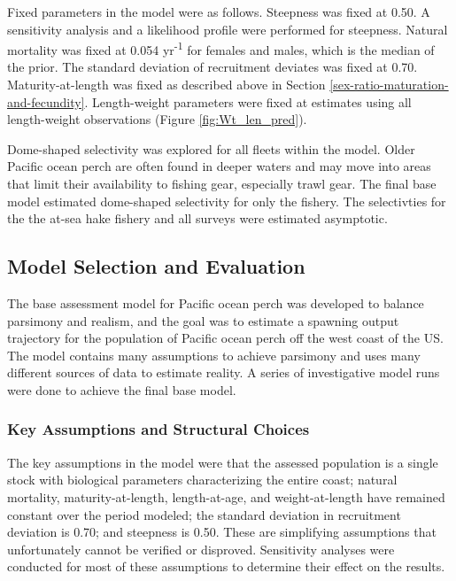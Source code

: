 \documentclass[12pt,]{article}
\begin{document}
Fixed parameters in the model were as follows. Steepness was fixed at
0.50. A sensitivity analysis and a likelihood profile were performed for
steepness. Natural mortality was fixed at 0.054 yr\textsuperscript{-1}
for females and males, which is the median of the prior. The standard
deviation of recruitment deviates was fixed at 0.70. Maturity-at-length
was fixed as described above in Section
\ref{sex-ratio-maturation-and-fecundity}. Length-weight parameters were
fixed at estimates using all length-weight observations (Figure
\ref{fig:Wt_len_pred}).

Dome-shaped selectivity was explored for all fleets within the model.
Older Pacific ocean perch are often found in deeper waters and may move
into areas that limit their availability to fishing gear, especially
trawl gear. The final base model estimated dome-shaped selectivity for
only the fishery. The selectivties for the the at-sea hake fishery and
all surveys were estimated asymptotic.

\subsection{Model Selection and
Evaluation}\label{model-selection-and-evaluation}

The base assessment model for Pacific ocean perch was developed to
balance parsimony and realism, and the goal was to estimate a spawning
output trajectory for the population of Pacific ocean perch off the west
coast of the US. The model contains many assumptions to achieve
parsimony and uses many different sources of data to estimate reality. A
series of investigative model runs were done to achieve the final base
model.

\subsubsection{Key Assumptions and Structural
Choices}\label{key-assumptions-and-structural-choices}

The key assumptions in the model were that the assessed population is a
single stock with biological parameters characterizing the entire coast;
natural mortality, maturity-at-length, length-at-age, and
weight-at-length have remained constant over the period modeled; the
standard deviation in recruitment deviation is 0.70; and steepness is
0.50. These are simplifying assumptions that unfortunately cannot be
verified or disproved. Sensitivity analyses were conducted for most of
these assumptions to determine their effect on the results.
\end{document}
